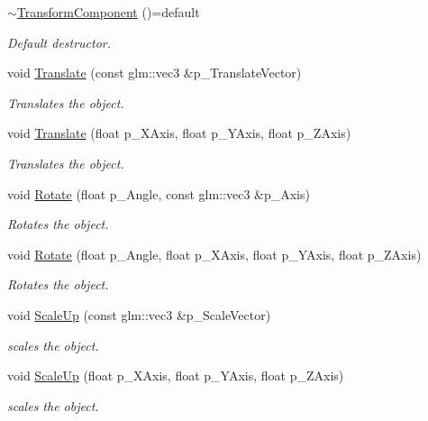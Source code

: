 \begin{DoxyCompactItemize}
\mbox{\hyperlink{class_transform_component_a5b87b5a6fad643d61fb7c56f6886f9b0}{$\sim$\+Transform\+Component}} ()=default
\begin{DoxyCompactList}\small\item\em Default destructor. \end{DoxyCompactList}\item 
void \mbox{\hyperlink{class_transform_component_a8ed8e408395067f6622a2eb935e40437}{Translate}} (const glm\+::vec3 \&p\+\_\+\+Translate\+Vector)
\begin{DoxyCompactList}\small\item\em Translates the object. \end{DoxyCompactList}\item 
void \mbox{\hyperlink{class_transform_component_a0d28658f165570312e1563b65b3a49a9}{Translate}} (float p\+\_\+\+X\+Axis, float p\+\_\+\+Y\+Axis, float p\+\_\+\+Z\+Axis)
\begin{DoxyCompactList}\small\item\em Translates the object. \end{DoxyCompactList}\item 
void \mbox{\hyperlink{class_transform_component_a2417252e806d5f67a5cdb25bd4e90a42}{Rotate}} (float p\+\_\+\+Angle, const glm\+::vec3 \&p\+\_\+\+Axis)
\begin{DoxyCompactList}\small\item\em Rotates the object. \end{DoxyCompactList}\item 
void \mbox{\hyperlink{class_transform_component_aabc8784119f8794363bc1b3cfe12c4a7}{Rotate}} (float p\+\_\+\+Angle, float p\+\_\+\+X\+Axis, float p\+\_\+\+Y\+Axis, float p\+\_\+\+Z\+Axis)
\begin{DoxyCompactList}\small\item\em Rotates the object. \end{DoxyCompactList}\item 
void \mbox{\hyperlink{class_transform_component_a1daa4e89db099d77bf04ccf30c0ea07b}{Scale\+Up}} (const glm\+::vec3 \&p\+\_\+\+Scale\+Vector)
\begin{DoxyCompactList}\small\item\em scales the object. \end{DoxyCompactList}\item 
void \mbox{\hyperlink{class_transform_component_a7f94e013cbae914fcffd9bb9d8364a49}{Scale\+Up}} (float p\+\_\+\+X\+Axis, float p\+\_\+\+Y\+Axis, float p\+\_\+\+Z\+Axis)
\begin{DoxyCompactList}\small\item\em scales the object. \end{DoxyCompactList}\item 

\end{DoxyCompactItemize}
